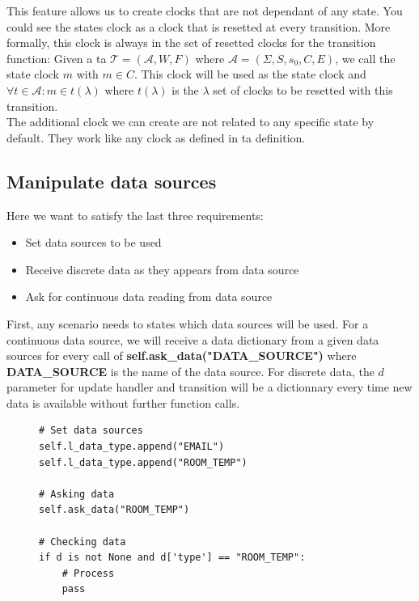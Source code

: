 \documentclass[12pt]{article}
\theoremstyle{definition}
\theoremstyle{definition}
\theoremstyle{remark}
\newcommand{\A}{\mathcal{A}}
\begin{document}
This feature allows us to create clocks that are not dependant of any state. You could see the states clock as a clock that is resetted at every transition. More formally, this clock is always in the set of resetted clocks for the transition function: Given a \gls{ta} $\mathcal{T} = (\A, W, F)$ where $\A = (\Sigma, S, s_{0},C, E)$, we call the state clock $m$ with $m \in C$. This clock will be used as the state clock and $\forall t \in \A: m \in t(\lambda)$ where $t(\lambda)$ is the $\lambda$ set of clocks to be resetted with this transition.\\

The additional clock we can create are not related to any specific state by default. They work like any clock as defined in \gls{ta} definition.


\subsection{Manipulate data sources}

Here we want to satisfy the last three requirements:
\begin{itemize}
\item Set data sources to be used
\item Receive discrete data as they appears from data source
\item Ask for continuous data reading from data source
\end{itemize}

First, any scenario needs to states which data sources will be used. For a continuous data source, we will receive a data dictionary from a given data sources for every call of \textbf{self.ask\_data("DATA\_SOURCE")} where \textbf{DATA\_SOURCE} is the name of the data source. For discrete data, the $d$ parameter for update handler and transition will be a dictionnary every time new data is available without further function calls.

\begin{figure}[H]
    \begin{lstlisting}[caption="Set data source",label={lst:python-data-sources}]
# Set data sources
self.l_data_type.append("EMAIL")
self.l_data_type.append("ROOM_TEMP")

# Asking data
self.ask_data("ROOM_TEMP")

# Checking data
if d is not None and d['type'] == "ROOM_TEMP":
    # Process
    pass
    \end{lstlisting}
\end{figure}
\end{document}
